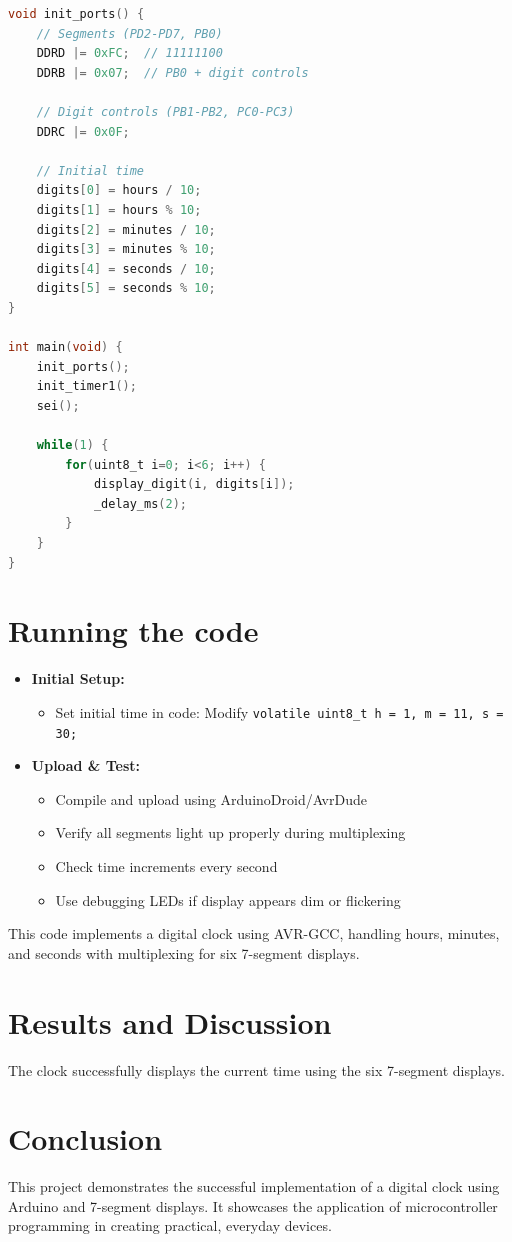 \documentclass[journal]{IEEEtran}
\begin{document}
\begin{lstlisting}[language=C]
void init_ports() {
    // Segments (PD2-PD7, PB0)
    DDRD |= 0xFC;  // 11111100
    DDRB |= 0x07;  // PB0 + digit controls
    
    // Digit controls (PB1-PB2, PC0-PC3)
    DDRC |= 0x0F;
    
    // Initial time
    digits[0] = hours / 10;
    digits[1] = hours % 10;
    digits[2] = minutes / 10;
    digits[3] = minutes % 10;
    digits[4] = seconds / 10;
    digits[5] = seconds % 10;
}

int main(void) {
    init_ports();
    init_timer1();
    sei();

    while(1) {
        for(uint8_t i=0; i<6; i++) {
            display_digit(i, digits[i]);
            _delay_ms(2);
        }
    }
}
\end{lstlisting}
\section{Running the code}
\begin{itemize}
    
\item \textbf{Initial Setup:}
    \begin{itemize}
        \item Set initial time in code: Modify \texttt{volatile uint8\_t h = 1, m = 11, s = 30;}
    \end{itemize}
    
    \item \textbf{Upload \& Test:}
    \begin{itemize}
        \item Compile and upload using ArduinoDroid/AvrDude
        \item Verify all segments light up properly during multiplexing
        \item Check time increments every second
        \item Use debugging LEDs if display appears dim or flickering
    \end{itemize}
\end{itemize}
This code implements a digital clock using AVR-GCC, handling hours, minutes, and seconds with multiplexing for six 7-segment displays.


\section{Results and Discussion}
The clock successfully displays the current time using the six 7-segment displays. 
\section{Conclusion}
This project demonstrates the successful implementation of a digital clock using Arduino and 7-segment displays. It showcases the application of microcontroller programming in creating practical, everyday devices.




\end{document}
